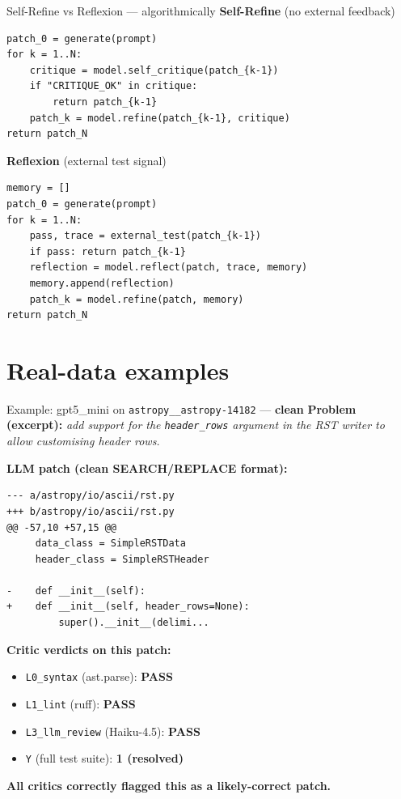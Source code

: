 \documentclass[10pt]{beamer}
\newcommand{\good}[1]{\textcolor{accentGreen}{\textbf{#1}}}
\newcommand{\info}[1]{\textcolor{primaryBlue}{\textbf{#1}}}
\begin{document}
\begin{frame}[fragile]{Self-Refine vs Reflexion --- algorithmically}
\textcolor{accentPurple}{\textbf{Self-Refine}} (no external feedback)
\begin{lstlisting}
patch_0 = generate(prompt)
for k = 1..N:
    critique = model.self_critique(patch_{k-1})
    if "CRITIQUE_OK" in critique:
        return patch_{k-1}
    patch_k = model.refine(patch_{k-1}, critique)
return patch_N
\end{lstlisting}

\textcolor{accentTeal}{\textbf{Reflexion}} (external test signal)
\begin{lstlisting}
memory = []
patch_0 = generate(prompt)
for k = 1..N:
    pass, trace = external_test(patch_{k-1})
    if pass: return patch_{k-1}
    reflection = model.reflect(patch, trace, memory)
    memory.append(reflection)
    patch_k = model.refine(patch, memory)
return patch_N
\end{lstlisting}
\end{frame}


\section{Real-data examples}
\hypertarget{out:3}{}

\begin{frame}[fragile]{Example: gpt5\_mini on \texttt{astropy\_\_astropy-14182} --- \good{clean}}
\info{Problem (excerpt):} \emph{add support for the \texttt{header\_rows}
argument in the RST writer to allow customising header rows.}

\info{LLM patch (clean SEARCH/REPLACE format):}
\begin{lstlisting}[basicstyle=\ttfamily\tiny]
--- a/astropy/io/ascii/rst.py
+++ b/astropy/io/ascii/rst.py
@@ -57,10 +57,15 @@
     data_class = SimpleRSTData
     header_class = SimpleRSTHeader

-    def __init__(self):
+    def __init__(self, header_rows=None):
         super().__init__(delimi...
\end{lstlisting}

\info{Critic verdicts on this patch:}
\begin{itemize}
\item \texttt{L0\_syntax} (ast.parse): \good{PASS}
\item \texttt{L1\_lint} (ruff): \good{PASS}
\item \texttt{L3\_llm\_review} (Haiku-4.5): \good{PASS}
\item \texttt{Y} (full test suite): \good{1 (resolved)}
\end{itemize}
\good{All critics correctly flagged this as a likely-correct patch.}
\end{frame}
\end{document}

